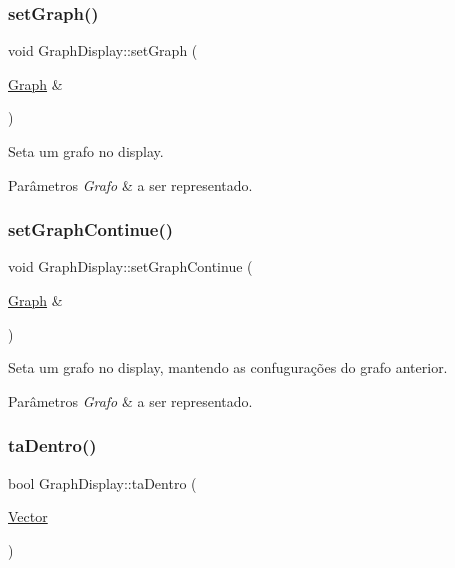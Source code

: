 \subsubsection{\texorpdfstring{setGraph()}{setGraph()}}
{\footnotesize\ttfamily void Graph\+Display\+::set\+Graph (\begin{DoxyParamCaption}\item[{\mbox{\hyperlink{classGraph}{Graph}} \&}]{ }\end{DoxyParamCaption})}

Seta um grafo no display. 
\begin{DoxyParams}{Parâmetros}
{\em Grafo} & a ser representado. \\
\hline
\end{DoxyParams}
\mbox{\label{classGraphDisplay_ab90cdfe3694a8a34767dc50268cf5a50}} 
\subsubsection{\texorpdfstring{setGraphContinue()}{setGraphContinue()}}
{\footnotesize\ttfamily void Graph\+Display\+::set\+Graph\+Continue (\begin{DoxyParamCaption}\item[{\mbox{\hyperlink{classGraph}{Graph}} \&}]{ }\end{DoxyParamCaption})}

Seta um grafo no display, mantendo as confugurações do grafo anterior. 
\begin{DoxyParams}{Parâmetros}
{\em Grafo} & a ser representado. \\
\hline
\end{DoxyParams}
\mbox{\label{classGraphDisplay_a6d822244f05f8a0dd1e40a40d13294bf}} 
\subsubsection{\texorpdfstring{taDentro()}{taDentro()}}
{\footnotesize\ttfamily bool Graph\+Display\+::ta\+Dentro (\begin{DoxyParamCaption}\item[{\mbox{\hyperlink{classVector}{Vector}}}]{ }\end{DoxyParamCaption})}

